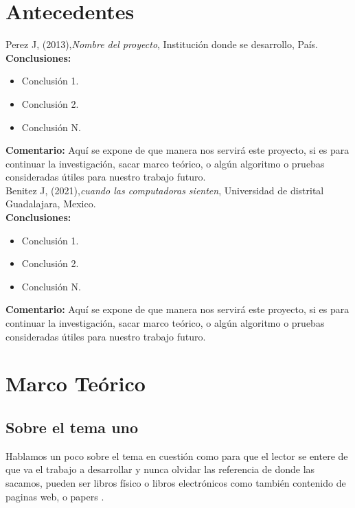 
\section{Antecedentes}
\noindent
Perez J, (2013),\textit{Nombre del proyecto}, Institución donde se desarrollo, País.\\

\noindent
\textbf{Conclusiones:}
\begin{itemize}
	\item Conclusión 1.
	\item Conclusión 2.
	\item Conclusión N.
\end{itemize}

\noindent
\textbf{Comentario:} Aquí se expone de que manera nos servirá este proyecto, si es para continuar la investigación, sacar marco teórico, o algún algoritmo o pruebas consideradas útiles para nuestro trabajo futuro.\\

\noindent
Benitez J, (2021),\textit{cuando las computadoras sienten}, Universidad de distrital Guadalajara, Mexico.\\

\noindent
\textbf{Conclusiones:}
\begin{itemize}
	\item Conclusión 1.
	\item Conclusión 2.
	\item Conclusión N.
\end{itemize}

\noindent
\textbf{Comentario:} Aquí se expone de que manera nos servirá este proyecto, si es para continuar la investigación, sacar marco teórico, o algún algoritmo o pruebas consideradas útiles para nuestro trabajo futuro.


\section{Marco Teórico}
\subsection{Sobre el tema uno}
Hablamos un poco sobre el tema en cuestión como para que el lector se entere de que va el trabajo a desarrollar y nunca olvidar las referencia de donde las sacamos, pueden ser libros físico o libros electrónicos como también contenido de paginas web, o papers \citep{Larranaga}.


